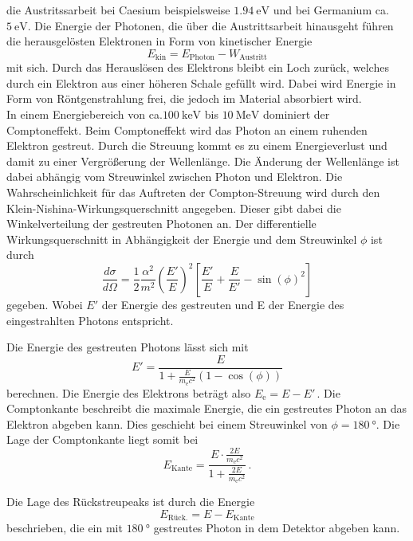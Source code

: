 die Austritssarbeit bei Caesium beispielsweise $\SI{1,94}{\electronvolt}$ und bei Germanium
ca. $\SI{5}{\electronvolt}$. Die Energie der Photonen, die über die Austrittsarbeit hinausgeht
führen die herausgelösten Elektronen in Form von kinetischer Energie
\begin{equation*}
    E_\text{kin} = E_\text{Photon} - W_\text{Austritt}
\end{equation*}
mit sich. Durch das Herauslösen des Elektrons bleibt ein Loch zurück, welches durch ein Elektron
aus einer höheren Schale gefüllt wird. Dabei wird Energie in Form von Röntgenstrahlung frei, die
jedoch im Material absorbiert wird. \\
In einem Energiebereich von ca.$\SI{100}{\kilo\electronvolt}$ bis $\SI{10}{\mega\electronvolt}$ dominiert
der Comptoneffekt. Beim Comptoneffekt wird das Photon an einem ruhenden Elektron gestreut.
Durch die Streuung kommt es zu einem Energieverlust und damit zu einer Vergrößerung der
Wellenlänge. Die Änderung der Wellenlänge ist dabei abhängig vom Streuwinkel zwischen Photon und
Elektron. Die Wahrscheinlichkeit für das Auftreten der Compton-Streuung wird durch den
Klein-Nishina-Wirkungsquerschnitt angegeben. Dieser gibt dabei die Winkelverteilung der gestreuten
Photonen an.
Der differentielle Wirkungsquerschnitt in Abhängigkeit der Energie und dem Streuwinkel $\phi$ ist durch
\begin{equation*}
    \frac{d\sigma}{d\Omega} = \frac{1}{2} \frac{\alpha^2}{m^2} \left(\frac{E'}{E}\right)^2 \left[\frac{E'}{E}+\frac{E}{E'}-\sin(\phi)^2\right]
\end{equation*} \noindent
gegeben. Wobei $E'$ der Energie des gestreuten und E der Energie des eingestrahlten Photons entspricht.

Die Energie des gestreuten Photons lässt sich mit
\begin{equation}
  E' = \frac{E}{1+\frac{E}{m_\text{e}c^2}(1-\cos(\phi))}
  \label{eqn:Compton}
\end{equation}
berechnen.
Die Energie des Elektrons beträgt also $E_\text{e} = E-E'\,$.
Die Comptonkante beschreibt die maximale Energie, die ein gestreutes Photon an das Elektron abgeben kann.
Dies geschieht bei einem Streuwinkel von $\phi = \SI{180}{\degree}$.
Die Lage der Comptonkante liegt somit bei
\begin{equation}
  E_\text{Kante} = \frac{E \cdot \frac{2E}{m_\text{e}c^2}}{1+\frac{2E}{m_\text{e}c^2}} \, .
  \label{eqn:Comptonkante}
\end{equation}

Die Lage des Rückstreupeaks ist durch die Energie
\begin{equation}
  E_\text{Rück.} = E - E_\text{Kante}
  \label{eqn:Compton_Rückstreupeak}
\end{equation}
beschrieben, die ein mit $\SI{180}{\degree}$ gestreutes Photon in dem Detektor abgeben kann.

